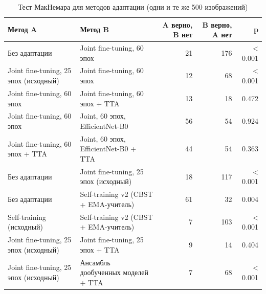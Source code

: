 \begin{table}[htbp]
\centering
\caption{Тест МакНемара для методов адаптации (одни и те же 500 изображений)}
\label{tab:da-cv-mcnemar}
\begin{tabular}{llrrr}
\toprule
Метод A & Метод B & A верно, B нет & B верно, A нет & p \\
\midrule
Без адаптации & Joint fine-tuning, 60 эпох & 21 & 176 & < 0.001 \\
Joint fine-tuning, 25 эпох (исходный) & Joint fine-tuning, 60 эпох & 12 & 68 & < 0.001 \\
Joint fine-tuning, 60 эпох & Joint fine-tuning, 60 эпох + TTA & 13 & 18 & 0.472 \\
Joint fine-tuning, 60 эпох & Joint, 60 эпох, EfficientNet-B0 & 56 & 54 & 0.924 \\
Joint fine-tuning, 60 эпох + TTA & Joint, 60 эпох, EfficientNet-B0 + TTA & 44 & 54 & 0.363 \\
Без адаптации & Joint fine-tuning, 25 эпох (исходный) & 18 & 117 & < 0.001 \\
Без адаптации & Self-training v2 (CBST + EMA-учитель) & 61 & 32 & 0.004 \\
Self-training (исходный) & Self-training v2 (CBST + EMA-учитель) & 7 & 103 & < 0.001 \\
Joint fine-tuning, 25 эпох (исходный) & Joint fine-tuning, 25 эпох + TTA & 9 & 14 & 0.404 \\
Joint fine-tuning, 25 эпох (исходный) & Ансамбль дообученных моделей + TTA & 7 & 68 & < 0.001 \\
\bottomrule
\end{tabular}
\end{table}
